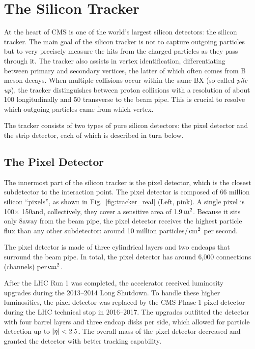 \section{The Silicon Tracker}
\label{sec:tracker}

At the heart of CMS is one of the world's largest silicon detectors: the silicon tracker.
The main goal of the silicon tracker is not to capture outgoing particles but to very precisely measure the hits from the charged particles as they pass through it.
The tracker also assists in vertex identification, differentiating between primary and secondary vertices, the latter of which often comes from B meson decays.
When multiple \pp collisions occur within the same BX (so-called \emph{pile up}), the tracker distinguishes between proton collisions with a resolution of about 100 \mum longitudinally and 50 \mum transverse to the beam pipe.
This is crucial to resolve which outgoing particles came from which \pp vertex.

The tracker consists of two types of pure silicon detectors: the pixel detector and the strip detector, each of which is described in turn below.

\subsection{The Pixel Detector}
\label{sec:pixel}

The innermost part of the silicon tracker is the pixel detector, which is the closest subdetector to the interaction point.
The pixel detector is composed of 66 million silicon ``pixels'', as shown in Fig.~\ref{fig:tracker_real} (Left, pink).
A single pixel is 100\mum $\times$ 150\mum and, collectively, they cover a sensitive area of 1.9$\meter^2$.
Because it sits only 8\cm away from the beam pipe, the pixel detector receives the highest particle flux than any other subdetector:
around 10 million particles/$\cm^2$ per second.

The pixel detector is made of three cylindrical layers and two endcaps that surround the beam pipe.
In total, the pixel detector has around 6,000 connections (channels) per$\cm^2$.

After the LHC Run 1 was completed, the accelerator received luminosity upgrades during the 2013--2014 Long Shutdown.
To handle these higher luminosities, the pixel detector was replaced by the CMS Phase-1 pixel detector during the LHC technical stop in 2016--2017.
The upgrades outfitted the detector with four barrel layers and three endcap disks per side, which allowed for particle detection up to $\abseta < 2.5$.
The overall mass of the pixel detector decreased and granted the detector with better tracking capability.

